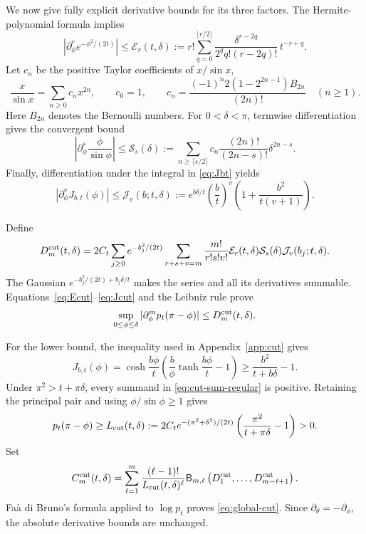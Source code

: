 We now give fully explicit derivative bounds for its three factors.  The
Hermite-polynomial formula implies
\begin{equation}\label{eq:Ecut}
 \left|\partial_\phi^r e^{-\phi^2/(2t)}\right|
 \le \mathcal E_r(t,\delta):=
 r!\sum_{q=0}^{\lfloor r/2\rfloor}
 \frac{\delta^{r-2q}}{2^q q!(r-2q)!}\,t^{-r+q}.
\end{equation}
Let $c_n$ be the positive Taylor coefficients of $x/\sin x$,
\[
 \frac{x}{\sin x}=\sum_{n\ge0}c_nx^{2n},\qquad
 c_0=1,\qquad
 c_n=\frac{(-1)^n2(1-2^{2n-1})B_{2n}}{(2n)!}\quad(n\ge1).
\]
Here $B_{2n}$ denotes the Bernoulli numbers.
For $0<\delta<\pi$, termwise differentiation gives the convergent bound
\begin{equation}\label{eq:Scut}
 \left|\partial_\phi^s\frac{\phi}{\sin\phi}\right|
 \le \mathcal S_s(\delta):=
 \sum_{n\ge\lceil s/2\rceil}c_n
 \frac{(2n)!}{(2n-s)!}\delta^{2n-s}.
\end{equation}
Finally, differentiation under the integral in \eqref{eq:Jbt} yields
\begin{equation}\label{eq:Jcut}
 |\partial_\phi^vJ_{b,t}(\phi)|
 \le \mathcal J_v(b;t,\delta):=
 e^{b\delta/t}\left(\frac bt\right)^v
 \left(1+\frac{b^2}{t(v+1)}\right).
\end{equation}

Define
\begin{equation}\label{eq:Dcut}
 D_m^{\rm cut}(t,\delta)=2C_t\sum_{j\ge0}e^{-b_j^2/(2t)}
 \sum_{r+s+v=m}\frac{m!}{r!s!v!}
 \mathcal E_r(t,\delta)\mathcal S_s(\delta)
 \mathcal J_v(b_j;t,\delta).
\end{equation}
The Gaussian $e^{-b_j^2/(2t)+b_j\delta/t}$ makes the series and all its
derivatives summable.  Equations~\eqref{eq:Ecut}--\eqref{eq:Jcut} and the
Leibniz rule prove
\begin{equation}\label{eq:pcut-derivative}
 \sup_{0\le\phi\le\delta}
 |\partial_\phi^m p_t(\pi-\phi)|\le D_m^{\rm cut}(t,\delta).
\end{equation}

For the lower bound, the inequality used in Appendix~\ref{app:cut} gives
\[
 J_{b,t}(\phi)
 =\cosh\frac{b\phi}{t}
 \left(\frac{b}{\phi}\tanh\frac{b\phi}{t}-1\right)
 \ge \frac{b^2}{t+b\delta}-1.
\]
Under $\pi^2>t+\pi\delta$, every summand in
\eqref{eq:cut-sum-regular} is positive.  Retaining the principal pair and
using $\phi/\sin\phi\ge1$ gives
\begin{equation}\label{eq:Lcut}
 p_t(\pi-\phi)\ge L_{\rm cut}(t,\delta):=
 2C_t e^{-(\pi^2+\delta^2)/(2t)}
 \left(\frac{\pi^2}{t+\pi\delta}-1\right)>0.
\end{equation}
Set
\begin{equation}\label{eq:Ccut}
 C_m^{\rm cut}(t,\delta)=
 \sum_{\ell=1}^m\frac{(\ell-1)!}{L_{\rm cut}(t,\delta)^\ell}
 \mathsf{B}_{m,\ell}\left(D_1^{\rm cut},\ldots,
 D_{m-\ell+1}^{\rm cut}\right).
\end{equation}
Fa\`a di Bruno's formula applied to $\log p_t$ proves
\eqref{eq:global-cut}.  Since $\partial_\theta=-\partial_\phi$, the absolute
derivative bounds are unchanged.

